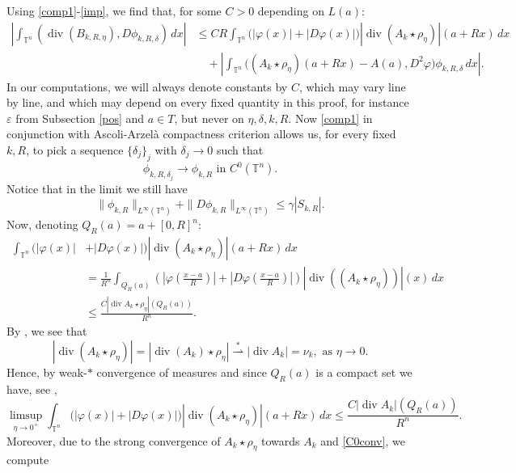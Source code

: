 \documentclass[10pt,reqno]{amsart}
\numberwithin{equation}{section}
\newcommand{\weak}{\overset{*}{\rightharpoonup}}
\newcommand{\T}{\mathbb{T}}
\DeclareMathOperator{\dv}{div}
\theoremstyle{plain}
\theoremstyle{definition}
\theoremstyle{remark}
\begin{document}
Using \eqref{comp1}-\eqref{imp}, we find that, for some $C > 0$ depending on $L(a)$:
\begin{equation}\label{BkR3}
\begin{split}
\left|\int_{\T^n}(\dv(B_{k,R,\eta}),D\phi_{k,R,\delta})\,dx\right| &\le CR\int_{\T^n}\Big(|\varphi(x)| + |D\varphi(x)|\Big)|\dv(A_k\star \rho_\eta)|(a + Rx)\,dx   \\
&\quad+\left|\int_{\T^n}\Big((A_k\star \rho_\eta)(a + Rx) -A(a),D^2\varphi\Big) \phi_{k,R,\delta}\,dx\right|.
\end{split}
\end{equation}
In our computations, we will always denote constants by $C$, which may vary line by line, and which may depend on every fixed quantity in this proof, for instance $\varepsilon$ from Subsection \ref{pos} and $a \in T$, but never on $\eta,\delta,k,R$. Now \eqref{comp1} in conjunction with Ascoli-Arzel\`a compactness criterion allows us, for every fixed $k,R$, to pick a sequence $\{\delta_j\}_j$ with $\delta_j \to 0$ such that
\begin{equation}\label{C0conv}
\phi_{k,R,\delta_j} \to \phi_{k,R} \text{ in }C^0(\T^n).
\end{equation}
Notice that in the limit we still have
\begin{equation}\label{comp2}
\|\phi_{k,R}\|_{L^\infty(\T^n)} +\|D \phi_{k,R}\|_{L^\infty(\T^n)} \le \gamma|S_{k,R}|.
\end{equation}
Now, denoting $Q_R(a)=a+ [0,R]^n$:
\begin{align*}
\int_{\T^n}\Big(|\varphi(x)| &+ |D\varphi(x)|\Big)|\dv(A_k\star \rho_\eta)|(a + Rx)\,dx \\
&= \frac{1}{R^n}\int_{Q_R(a)}\left(\left|\varphi\left(\frac{x-a}{R}\right)\right| + \left|D\varphi\left(\frac{x-a}{R}\right)\right|\right)|\dv((A_k\star \rho_\eta))|(x)\,dx\\
& \le \frac{C|\dv A_k \star \rho_\eta|( Q_R(a))}{R^n}.
\end{align*}
By \cite[Thm.  4.36]{MAG}, we see that
\[
|\dv(A_k\star \rho_\eta)| = |\dv(A_k)\star \rho_\eta|\weak |\dv A_k| = \nu_k, \text{ as }\eta \to 0. 
\]
Hence, by weak-$*$ convergence of measures and since $Q_{R}(a)$ is a compact set we have, see \cite[Thm. 1.40]{EVG},
\begin{equation}\label{dveta}
\limsup_{\eta \to 0^+}\int_{\T^n}\Big(|\varphi(x)| + |D\varphi(x)|\Big)|\dv (A_k\star \rho_\eta)|(a + Rx)\,dx \le \frac{C|\dv A_k|( Q_R(a))}{R^n}.
\end{equation}
Moreover, due to the strong convergence of $A_k\star \rho_\eta$ towards $A_k$ and \eqref{C0conv}, we compute
\end{document}
